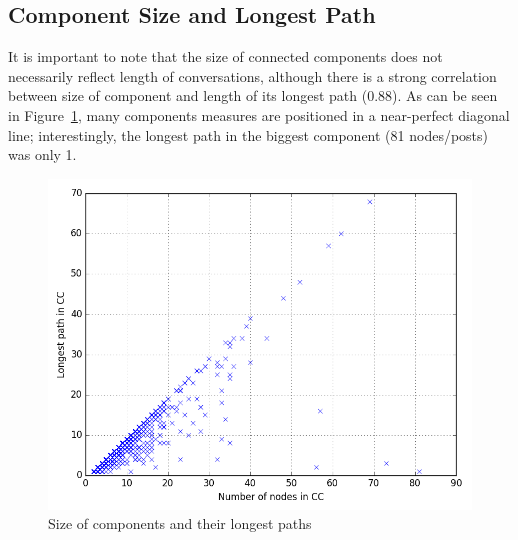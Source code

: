 \documentclass[sigconf]{acmart}
\begin{document}
{%

\subsection{Component Size and Longest Path}

It is important to note that the size of connected components does not
necessarily reflect length of conversations, although there is a
strong correlation between size of component and length of its longest
path (0.88). As can be seen in Figure~\ref{fig:ccsizepaths}, many
components measures are positioned in a near-perfect diagonal line;
interestingly, the longest path in the biggest component (81
nodes/posts) was only 1.

\begin{figure}[htb]
\centering
\includegraphics[width=\columnwidth]{images/ccsizepaths.png}
\caption{Size of components and their longest paths}
\label{fig:ccsizepaths}
\end{figure}

}
\end{document}

